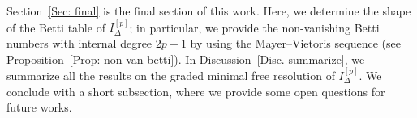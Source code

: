 \documentclass[12pt]{amsart}
\begin{document}
Section~\ref{Sec: final} is the final section of this work. Here, we determine the shape of the Betti table of $I_{\Delta}^{[p]}$; in particular, we provide the non-vanishing Betti numbers with internal degree $2p+1$ by using the Mayer--Vietoris sequence (see Proposition~\ref{Prop: non van betti}). In Discussion~\ref{Disc. summarize}, we summarize all the results on the graded minimal free resolution of $I_{\Delta}^{[p]}$. We conclude with a short subsection, where we provide some open questions for future works.




\end{document}
